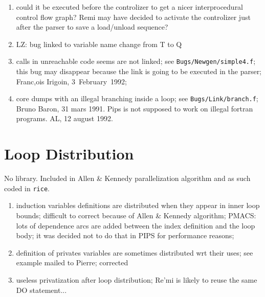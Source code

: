 \begin{enumerate}

  \item could  it be executed before the controlizer
to get a nicer interprocedural control flow graph? Remi may have decided
to activate the controlizer just after the parser to save a load/unload
sequence?

  \item LZ: bug linked to variable name change from T to Q

  \item calls in unreachable code seems are not linked; see
        \verb+Bugs/Newgen/simple4.f+; this bug may disappear because the
        link is going to be executed in the parser; 
        Franc,ois Irigoin, 3~February~1992;

  \item core dumps with an illegal branching inside a loop; see
        \verb+Bugs/Link/branch.f+; Bruno Baron, 31 mars 1991.
        Pips is not supposed to work on illegal fortran programs.
        AL, 12 august 1992.

\end{enumerate}

\section{Loop Distribution}

No library. Included in Allen \& Kennedy parallelization algorithm and
as such coded in \verb+rice+.

\begin{enumerate}

  \item induction variables definitions are distributed when they appear
        in inner loop bounds; difficult to correct because of Allen \&
        Kennedy algorithm; PMACS: lots of dependence arcs are added between
        the index definition and the loop body; it was decided not to do
        that in PIPS for performance reasons;

  \item definition of privates variables are sometimes distributed wrt
        their uses; see example mailed to Pierre; corrected

  \item useless privatization after loop distribution; Re'mi is likely to
        reuse the same DO statement...

\end{enumerate}

